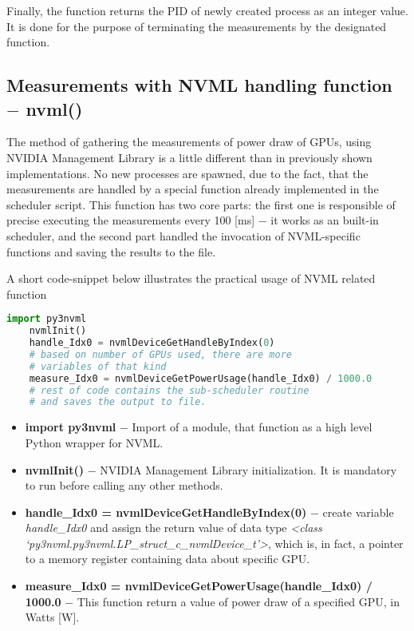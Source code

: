 Finally, the function returns the PID of newly created process
as an integer value. It is done for the purpose of terminating the
measurements by the designated function.

\subsection{Measurements with NVML handling function $-$ nvml\@()}

The method of gathering the measurements of power draw of GPUs, using NVIDIA
Management Library is a little different than in previously shown
implementations. No new processes are spawned, due to the fact, that the
measurements are handled by a special function already implemented in the
scheduler script. This function has two core parts: the first one is
responsible of precise executing the measurements every 100 [ms] $-$ it works
as an built-in scheduler, and the second part handled the invocation of
NVML-specific functions and saving the results to the file.

A short code-snippet below illustrates the practical usage of NVML related
function

\begin{lstlisting}[language=Python]
    import py3nvml
    nvmlInit()
    handle_Idx0 = nvmlDeviceGetHandleByIndex(0)
    # based on number of GPUs used, there are more
    # variables of that kind
    measure_Idx0 = nvmlDeviceGetPowerUsage(handle_Idx0) / 1000.0
    # rest of code contains the sub-scheduler routine
    # and saves the output to file.
\end{lstlisting}

\begin{itemize}
    \item \textbf{import py3nvml} $-$ Import of a module, that function as
    a high level Python wrapper for NVML\@.
    \item \textbf{nvmlInit\@()} $-$ NVIDIA Management Library initialization.
    It is mandatory to run before calling any other methods.
    \item \textbf{handle\_Idx0 = nvmlDeviceGetHandleByIndex\@(0)} $-$ create
    variable \emph{handle\_Idx0} and assign the return value of data type
    \emph{<class `py3nvml.py3nvml.LP\_struct\_c\_nvmlDevice\_t'>}, which is,
    in fact, a pointer to a memory register containing data about specific
    GPU\@.
    \item \textbf{measure\_Idx0 = nvmlDeviceGetPowerUsage\@(handle\_Idx0) / 1000.0}
    $-$ This function return a value of power draw of a specified GPU, in
    Watts [W]. 
\end{itemize}

